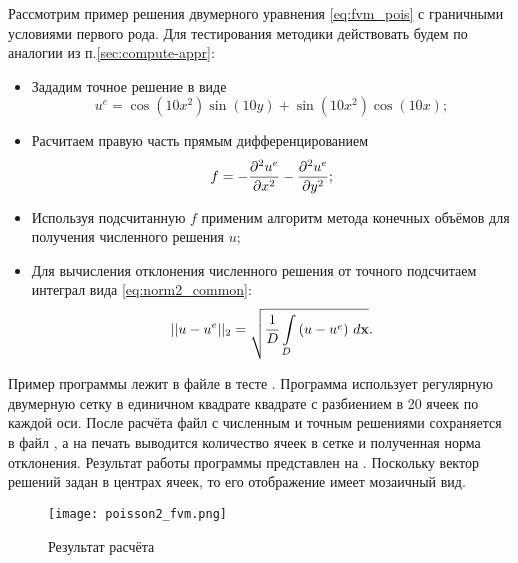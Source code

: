 Рассмотрим пример решения двумерного уравнения \cref{eq:fvm_pois}
с граничными условиями первого рода.
Для тестирования методики действовать будем
по аналогии из п.\ref{sec:compute-appr}:
\begin{itemize}
\item
Зададим точное решение в виде
$$
u^e = \cos(10 x^2) \sin(10 y) + \sin(10 x^2)\cos(10 x);
$$
\item
Расчитаем правую часть прямым дифференцированием
$$
f = -\frac{\partial^2 u^e}{\partial x^2} - \frac{\partial^2 u^e}{\partial y^2};
$$
\item
Используя подсчитанную $f$ применим алгоритм метода конечных объёмов для
получения численного решения $u$;
\item
Для вычисления отклонения численного решения от точного подсчитаем интеграл вида
\cref{eq:norm2_common}:
\begin{equation}
\label{eq:fvm_norm2}
||u - u^e||_2 = \sqrt{\frac{1}{D}\arint{\left(u - u^e\right)}{D}{\vec x}}.
\end{equation}
\end{itemize}

Пример программы лежит в файле 
в тесте .
Программа использует регулярную двумерную
сетку в единичном квадрате квадрате с разбиением
в 20 ячеек по каждой оси.
После расчёта файл с численным и точным
решениями сохраняется в файл ,
а на печать выводится количество ячеек в сетке и полученная
норма отклонения. Результат работы программы представлен на .
Поскольку вектор решений задан в центрах ячеек, то его отображение имеет
мозаичный вид.

\begin{figure}[h!]
\centering
\texttt{[image: poisson2\_fvm.png]}
\caption{Результат расчёта}
\label{fig:poisson2_fvm}
\end{figure}

